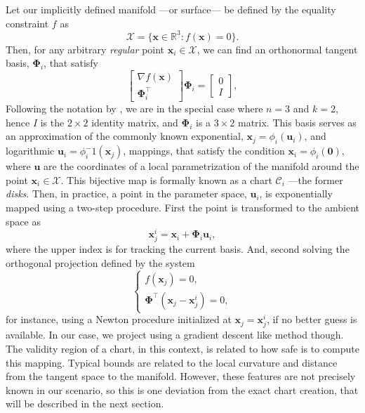 Let our implicitly defined manifold ---or surface--- be defined by the equality constraint $f$ as
\begin{equation}
\mathcal{X} = \{\mathbf{x} \in \mathbb{R}^3 : f(\mathbf{x}) = 0 \}.
\end{equation}
Then, for any arbitrary \emph{regular} point $\mathbf{x}_i \in \mathcal{X}$, we can find an orthonormal tangent basis, $\boldsymbol{\Phi}_i$, that satisfy
\begin{equation}
\begin{bmatrix} \nabla f(\mathbf{x}) \\ \boldsymbol{\Phi}_i^\top \end{bmatrix} \boldsymbol{\Phi}_i = \begin{bmatrix}  0 \\ I \end{bmatrix}, \label{eq:tangent_basis}
\end{equation}
Following the notation by \citet{Porta2014CuikSuite}, we are in the special case where $n=3$ and $k=2$, hence $I$ is the $2\times2$ identity matrix, and $\boldsymbol{\Phi}_i$ is a $3\times2$ matrix. This basis serves as an approximation of the commonly known exponential, $\mathbf{x}_j = \phi_i(\mathbf{u}_i)$, and logarithmic $\mathbf{u}_i = \phi_i^-1(\mathbf{x}_j)$, mappings, that satisfy the condition $\mathbf{x}_i = \phi_i(\mathbf{0})$, where $\mathbf{u}$ are the coordinates of a local parametrization of the manifold around the point $\mathbf{x}_i \in \mathcal{X}$. This bijective map is formally known as a chart $\mathcal{C}_i$ ---the former \emph{disks}. Then, in practice, a point in the parameter space, $\mathbf{u}_i$, is exponentially mapped using a two-step procedure. First the point is transformed to the ambient space as
\begin{equation}
  \mathbf{x}_j^i = \mathbf{x}_i + \boldsymbol{\Phi}_i \mathbf{u}_i,
\end{equation}
where the upper index is for tracking the current basis. And, second solving the orthogonal projection defined by the system
\begin{equation}
\begin{cases}
f(\mathbf{x}_j) = 0,
\\ 
\boldsymbol{\Phi}^\top( \mathbf{x}_j - \mathbf{x}_j^i ) = 0,
\end{cases}
\end{equation}
for instance, using a Newton procedure initialized at $\mathbf{x}_j = \mathbf{x}_j^i$, if no better guess is available. In our case, we project using a gradient descent like method though. The validity region of a chart, in this context, is related to how safe is to compute this mapping. Typical bounds are related to the local curvature and distance from the tangent space to the manifold. However, these features are not precisely known in our scenario, so this is one deviation from the exact chart creation, that will be described in the next section. 

